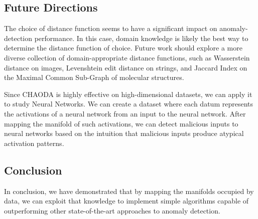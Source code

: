 
\subsection{Future Directions}
\label{subsec:discussion:duture-directions}

The choice of distance function seems to have a significant impact on anomaly-detection performance.
In this case, domain knowledge is likely the best way to determine the distance function of choice.
Future work should explore a more diverse collection of domain-appropriate distance functions, such as Wasserstein distance on images, Levenshtein edit distance on strings, and Jaccard Index on the Maximal Common Sub-Graph of molecular structures.

Since CHAODA is highly effective on high-dimensional datasets, we can apply it to study Neural Networks.
We can create a dataset where each datum represents the activations of a neural network from an input to the neural network.
After mapping the manifold of such activations, we can detect malicious inputs to neural networks based on the intuition that malicious inputs produce atypical activation patterns.

\subsection{Conclusion}
\label{subsec:discussion:conlcusion}

In conclusion, we have demonstrated that by mapping the manifolds occupied by data, we can exploit that knowledge to implement simple algorithms capable of outperforming other state-of-the-art approaches to anomaly detection.
